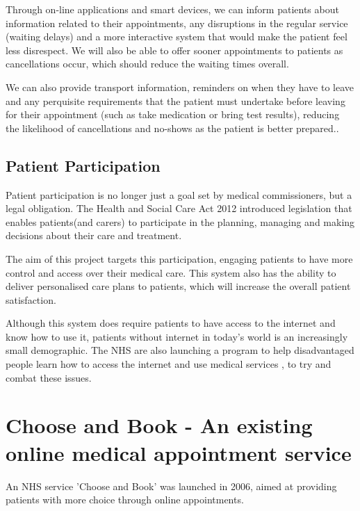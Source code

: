 Through on-line applications and smart devices, we can inform patients about information related to their appointments, any disruptions in the regular service (waiting delays) and a more interactive system that would make the patient feel less disrespect. We will also be able to offer sooner appointments to patients as cancellations occur, which should reduce the waiting times overall.

We can also provide transport information, reminders on when they have to leave and any perquisite requirements that the patient must undertake before leaving for their appointment (such as take medication or bring test results), reducing the likelihood of cancellations and no-shows as the patient is better prepared..

\subsection{Patient Participation}

Patient participation is no longer just a goal set by medical commissioners, but a legal obligation. The Health and Social Care Act 2012\cite{HSCA2012} introduced legislation that enables patients(and carers) to participate in the planning, managing and making decisions
about their care and treatment.

The aim of this project targets this participation, engaging patients to have more control and access over their medical care. This system also has the ability to deliver personalised care plans to patients, which will increase the overall patient satisfaction.

Although this system does require patients to have access to the internet and know how to use it, patients without internet in today's world is an increasingly small demographic. The NHS are also launching a program to help disadvantaged people learn how to access the internet and use medical services \cite{timKelsey}, to try and combat these issues. 


\section{Choose and Book - An existing online medical appointment service}

An NHS service 'Choose and Book' was launched in 2006, aimed at providing patients with more choice through online appointments\cite{Walford}.


